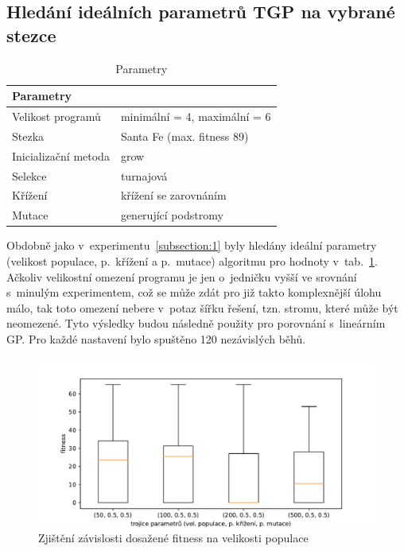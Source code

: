 \newpage
\subsection{Hledání ideálních parametrů TGP na vybrané stezce}\label{subsection:3} 
\begin{table}[h!]
\centering
\begin{tabular}{ll}
\hline
\textbf{Parametry}  &                               \\ \hline
Velikost programů   & minimální = 4, maximální = 6 \\
Stezka              & Santa Fe (max. fitness 89)     \\
Inicializační metoda & grow                          \\
Selekce             & turnajová                     \\
Křížení             & křížení se zarovnáním         \\
Mutace              & generující podstromy          \\ \hline
\end{tabular}
\caption{Parametry}
\label{tab:6.3.9}
\end{table}
Obdobně jako v~experimentu~\ref{subsection:1} byly hledány ideální parametry (velikost populace, p.~křížení a p.~mutace) algoritmu pro  hodnoty v~tab.~\ref{tab:6.3.9}. Ačkoliv velikostní omezení programu je jen o~jedničku vyšší ve srovnání s~minulým experimentem, což se může zdát pro již takto komplexnější úlohu málo, tak toto omezení nebere v~potaz šířku řešení, tzn. stromu, které může být neomezené. Tyto výsledky budou následně použity pro porovnání s~lineárním GP. Pro každé nastavení bylo spuštěno 120 nezávislých běhů.

\begin{figure}[!h]
    \centering
    \includegraphics[scale=0.65]{obrazky-figures/exp-tgp-santfe-searching-params-1.pdf}
    \caption{Zjištění závislosti dosažené fitness na velikosti populace}
    \label{fig:exp-tgp-santa-fe-1}
\end{figure} 

